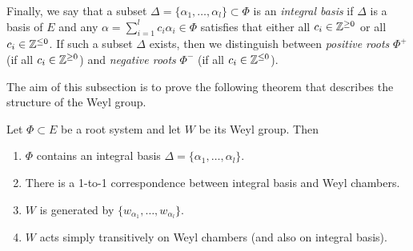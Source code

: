 Finally, we say that a subset $\Delta=\{\alpha_1,\ldots,\alpha_l\}\subset\Phi$ is an \textit{integral basis} if $\Delta$ is a basis of $E$ and any $\alpha=\sum_{i=1}^l c_i\alpha_i\in\Phi$ satisfies that either all $c_i\in\mathbb{Z}^{\geq 0}$ or all $c_i\in\mathbb{Z}^{\leq 0}$. If such a subset $\Delta$ exists, then we distinguish between \textit{positive roots} $\Phi^+$ (if all $c_i\in\mathbb{Z}^{\geq0}$) and \textit{negative roots} $\Phi^-$ (if all $c_i\in\mathbb{Z}^{\leq0}$).

The aim of this subsection is to prove the following theorem that describes the structure of the Weyl group.

\begin{theorem}\label{thm:weyl}
    Let $\Phi\subset E$ be a root system and let $W$ be its Weyl group. Then
    \begin{enumerate}[label=(\arabic*)]
        \item $\Phi$ contains an integral basis $\Delta=\{\alpha_1,\ldots,\alpha_l\}$.
        \item There is a 1-to-1 correspondence between integral basis and Weyl chambers.
        \item $W$ is generated by $\{w_{\alpha_1},\ldots,w_{\alpha_l}\}$.
        \item $W$ acts simply transitively on Weyl chambers (and also on integral basis).
    \end{enumerate}
\end{theorem}

